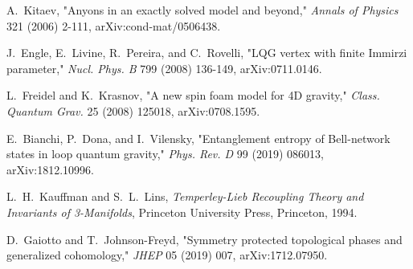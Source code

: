 \documentclass[11pt]{article}
\begin{document}
\begin{thebibliography}{8}
  A.~Kitaev, "Anyons in an exactly solved model and beyond,"
  \emph{Annals of Physics} 321 (2006) 2-111,
  arXiv:cond-mat/0506438.

  J.~Engle, E.~Livine, R.~Pereira, and C.~Rovelli,
  "LQG vertex with finite Immirzi parameter,"
  \emph{Nucl. Phys. B} 799 (2008) 136-149,
  arXiv:0711.0146.

  L.~Freidel and K.~Krasnov,
  "A new spin foam model for 4D gravity,"
  \emph{Class. Quantum Grav.} 25 (2008) 125018,
  arXiv:0708.1595.

  E.~Bianchi, P.~Dona, and I.~Vilensky,
  "Entanglement entropy of Bell-network states in loop quantum gravity,"
  \emph{Phys. Rev. D} 99 (2019) 086013,
  arXiv:1812.10996.

  L.~H.~Kauffman and S.~L.~Lins,
  \emph{Temperley-Lieb Recoupling Theory and Invariants of 3-Manifolds},
  Princeton University Press, Princeton, 1994.

  D.~Gaiotto and T.~Johnson-Freyd, "Symmetry protected topological phases and generalized cohomology,"
  \emph{JHEP} 05 (2019) 007,
  arXiv:1712.07950.

\end{thebibliography}
\end{document}
